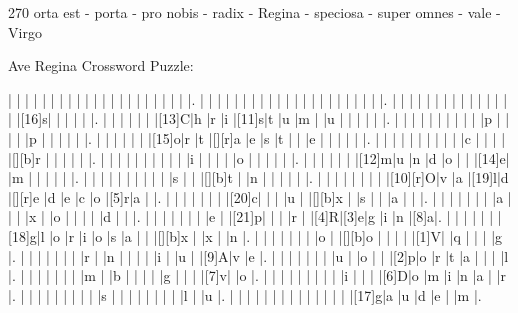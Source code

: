 \documentclass[12pt]{article}
\begin{document}
\pagestyle{fancy}
\fancyhf{}
\renewcommand{\headrulewidth}{0pt}
\renewcommand{\footrulewidth}{0pt}
\libertine
\renewcommand\PuzzleClueFont{\rm\normalsize}
\noindent\begin{rotate}{0}
\small
\end{rotate}
\hfill
\begin{rotate}{270}
\small
\qquad orta est - porta - pro nobis - radix - Regina - speciosa - super omnes - vale - Virgo
\end{rotate}
\begin{center}
  \huge{Ave Regina Crossword Puzzle:}
\end{center}
\vspace{1.5cm}
\begin{Puzzle}{22}{24}
  |{}  |{}  |{}  |{}  |{}  |{}  |{}  |{}  |{}  |{}  |{}  |{}  |{}  |{}  |{}  |{}  |{}  |{}  |{}  |{}  |{}  |.
  |{}  |{}  |{}  |{}  |{}  |{}  |{}  |{}  |{}  |{}  |{}  |{}  |{}  |{}  |{}  |{}  |{}  |{}  |{}  |{}  |{}  |.
  |{}  |{}  |{}  |{}  |{}  |{}  |{}  |{}  |{}  |{}  |{}  |{}  |{}  |{}  |{}  |[16]s|{}  |{}  |{}  |{}  |{}  |.
  |{}  |{}  |{}  |{}  |{}  |{}  |[13]C|h   |r   |i   |[11]s|t   |u   |m   |{}  |u   |{}  |{}  |{}  |{}  |{}  |.
  |{}  |{}  |{}  |{}  |{}  |{}  |{}  |{}  |{}  |{}  |p   |{}  |{}  |{}  |{}  |p   |{}  |{}  |{}  |{}  |{}  |.
  |{}  |{}  |{}  |{}  |{}  |{}  |[15]o|r   |t   |[][r]a   |e   |s   |t   |{}  |{}  |e   |{}  |{}  |{}  |{}  |{}  |.
  |{}  |{}  |{}  |{}  |{}  |{}  |{}  |{}  |{}  |{}  |c   |{}  |{}  |{}  |{}  |[][b]r   |{}  |{}  |{}  |{}  |{}  |.
  |{}  |{}  |{}  |{}  |{}  |{}  |{}  |{}  |{}  |{}  |i   |{}  |{}  |{}  |{}  |o   |{}  |{}  |{}  |{}  |{}  |.
  |{}  |{}  |{}  |{}  |{}  |{}  |[12]m|u   |n   |d   |o   |{}  |{}  |[14]e|{}  |m   |{}  |{}  |{}  |{}  |{}  |.
  |{}  |{}  |{}  |{}  |{}  |{}  |{}  |{}  |{}  |{}  |s   |{}  |{}  |[][b]t   |{}  |n   |{}  |{}  |{}  |{}  |{}  |.
  |{}  |{}  |{}  |{}  |{}  |{}  |{}  |{}  |[10][r]O|v   |a   |[19]l|d   |[][r]e   |d   |e   |c   |o   |[5]r|a   |{}  |.
  |{}  |{}  |{}  |{}  |{}  |{}  |{}  |[20]c|{}  |{}  |{}  |u   |{}  |[][b]x   |{}  |s   |{}  |{}  |a   |{}  |{}  |.
  |{}  |{}  |{}  |{}  |{}  |{}  |{}  |a   |{}  |{}  |{}  |x   |{}  |o   |{}  |{}  |{}  |{}  |d   |{}  |{}  |.
  |{}  |{}  |{}  |{}  |{}  |{}  |{}  |e   |{}  |[21]p|{}  |{}  |{}  |r   |{}  |[4]R|[3]e|g   |i   |n   |[8]a|.
  |{}  |{}  |{}  |{}  |{}  |{}  |[18]g|l   |o   |r   |i   |o   |s   |a   |{}  |{}  |[][b]x   |{}  |x   |{}  |n   |.
  |{}  |{}  |{}  |{}  |{}  |{}  |{}  |o   |{}  |[][b]o   |{}  |{}  |{}  |{}  |[1]V|{}  |q   |{}  |{}  |{}  |g   |.
  |{}  |{}  |{}  |{}  |{}  |{}  |{}  |r   |{}  |n   |{}  |{}  |{}  |{}  |i   |{}  |u   |{}  |[9]A|v   |e   |.
  |{}  |{}  |{}  |{}  |{}  |{}  |{}  |u   |{}  |o   |{}  |{}  |[2]p|o   |r   |t   |a   |{}  |{}  |{}  |l   |.
  |{}  |{}  |{}  |{}  |{}  |{}  |{}  |m   |{}  |b   |{}  |{}  |{}  |{}  |g   |{}  |{}  |{}  |[7]v|{}  |o   |.
  |{}  |{}  |{}  |{}  |{}  |{}  |{}  |{}  |{}  |i   |{}  |{}  |{}  |[6]D|o   |m   |i   |n   |a   |{}  |r   |.
  |{}  |{}  |{}  |{}  |{}  |{}  |{}  |{}  |{}  |s   |{}  |{}  |{}  |{}  |{}  |{}  |{}  |{}  |l   |{}  |u   |.
  |{}  |{}  |{}  |{}  |{}  |{}  |{}  |{}  |{}  |{}  |{}  |{}  |{}  |{}  |[17]g|a   |u   |d   |e   |{}  |m   |.
\end{Puzzle}
\end{document}

